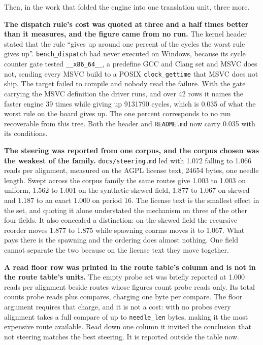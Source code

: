 Then, in the work that folded the engine into one translation unit, three more.

\textbf{The dispatch rule's cost was quoted at three and a half times better than it measures, and the figure came from no run.} The kernel header stated that the rule ``gives up around one percent of the cycles the worst rule gives up''. \texttt{bench\_dispatch} had never executed on Windows, because its cycle counter gate tested \texttt{\_\_x86\_64\_\_}, a predefine GCC and Clang set and MSVC does not, sending every MSVC build to a POSIX \texttt{clock\_gettime} that MSVC does not ship. The target failed to compile and nobody read the failure. With the gate carrying the MSVC definition the driver runs, and over 42 rows it names the faster engine 39 times while giving up 9131790 cycles, which is 0.035 of what the worst rule on the board gives up. The one percent corresponds to no run recoverable from this tree. Both the header and \texttt{README.md} now carry 0.035 with its conditions.

\textbf{The steering was reported from one corpus, and the corpus chosen was the weakest of the family.} \texttt{docs/steering.md} led with 1.072 falling to 1.066 reads per alignment, measured on the AGPL license text, 24654 bytes, one needle length. Swept across the corpus family the same routes give 1.003 to 1.003 on uniform, 1.562 to 1.001 on the synthetic skewed field, 1.877 to 1.067 on skewed and 1.187 to an exact 1.000 on period 16. The license text is the smallest effect in the set, and quoting it alone understated the mechanism on three of the other four fields. It also concealed a distinction: on the skewed field the recursive reorder moves 1.877 to 1.875 while spawning coarms moves it to 1.067. What pays there is the spawning and the ordering does almost nothing. One field cannot separate the two because on the license text they move together.

\textbf{A read floor row was printed in the route table's column and is not in the route table's units.} The empty probe set was briefly reported at 1.000 reads per alignment beside routes whose figures count probe reads only. Its total counts probe reads plus compares, charging one byte per compare. The floor argument requires that charge, and it is not a cost: with no probes every alignment takes a full compare of up to \texttt{needle\_len} bytes, making it the most expensive route available. Read down one column it invited the conclusion that not steering matches the best steering. It is reported outside the table now.

